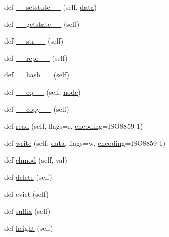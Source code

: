 \begin{DoxyCompactItemize}
\item 
def \hyperlink{classwaflib_1_1_node_1_1_node_ae1ce2af534851b1b56bc257f486be757}{\+\_\+\+\_\+setstate\+\_\+\+\_\+} (self, \hyperlink{lib_2expat_8h_ac39e72a1de1cb50dbdc54b08d0432a24}{data})
\item 
def \hyperlink{classwaflib_1_1_node_1_1_node_a5f7b73ba50d8a67499518eacf1946689}{\+\_\+\+\_\+getstate\+\_\+\+\_\+} (self)
\item 
def \hyperlink{classwaflib_1_1_node_1_1_node_aea11f410459c73450de99bd614222100}{\+\_\+\+\_\+str\+\_\+\+\_\+} (self)
\item 
def \hyperlink{classwaflib_1_1_node_1_1_node_a312e0f3ae404d593e43dc8afd8965de9}{\+\_\+\+\_\+repr\+\_\+\+\_\+} (self)
\item 
def \hyperlink{classwaflib_1_1_node_1_1_node_ad2272ed88f10bb1e6e2f473ec38fa5a4}{\+\_\+\+\_\+hash\+\_\+\+\_\+} (self)
\item 
def \hyperlink{classwaflib_1_1_node_1_1_node_a2fce3a217e2e7ef6192cb2e5e0671a4c}{\+\_\+\+\_\+eq\+\_\+\+\_\+} (self, \hyperlink{structnode}{node})
\item 
def \hyperlink{classwaflib_1_1_node_1_1_node_ac6b216662a82357074bf7508a313ac06}{\+\_\+\+\_\+copy\+\_\+\+\_\+} (self)
\item 
def \hyperlink{classwaflib_1_1_node_1_1_node_a05c37e221931a32e74bd11e2dbb38431}{read} (self, flags=\textquotesingle{}r\textquotesingle{}, \hyperlink{structencoding}{encoding}=\textquotesingle{}I\+S\+O8859-\/1\textquotesingle{})
\item 
def \hyperlink{classwaflib_1_1_node_1_1_node_a3e2f255b6614d98ff3f73903cc1a0439}{write} (self, \hyperlink{lib_2expat_8h_ac39e72a1de1cb50dbdc54b08d0432a24}{data}, flags=\textquotesingle{}w\textquotesingle{}, \hyperlink{structencoding}{encoding}=\textquotesingle{}I\+S\+O8859-\/1\textquotesingle{})
\item 
def \hyperlink{classwaflib_1_1_node_1_1_node_a7c69c9ee890bc2113f4f44c8b6d0aed5}{chmod} (self, val)
\item 
def \hyperlink{classwaflib_1_1_node_1_1_node_a5b15f6a29b5158a010fc78e7d2a4eef8}{delete} (self)
\item 
def \hyperlink{classwaflib_1_1_node_1_1_node_a31ebb3fd3aee8086605111ce83122453}{evict} (self)
\item 
def \hyperlink{classwaflib_1_1_node_1_1_node_a08a86be308b4ea7e209571274504852a}{suffix} (self)
\item 
def \hyperlink{classwaflib_1_1_node_1_1_node_a6f41a0f58447b1e67c4e4826e718f853}{height} (self)
\item 

\end{DoxyCompactItemize}
